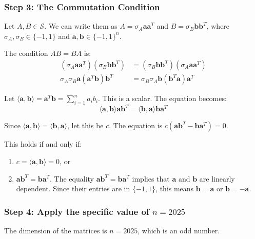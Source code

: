 \documentclass[12pt,a4paper]{article}
\theoremstyle{definition}
\begin{document}
        \subsubsection*{Step 3: The Commutation Condition}

        Let $A, B \in \mathcal{S}$. We can write them as $A = \sigma_A \mathbf{a}\mathbf{a}^T$ and $B = \sigma_B \mathbf{b}\mathbf{b}^T$, where $\sigma_A, \sigma_B \in \{-1, 1\}$ and $\mathbf{a}, \mathbf{b} \in \{-1, 1\}^n$.

        The condition $AB=BA$ is:
        \begin{align}
        (\sigma_A \mathbf{a}\mathbf{a}^T)(\sigma_B \mathbf{b}\mathbf{b}^T) &= (\sigma_B \mathbf{b}\mathbf{b}^T)(\sigma_A \mathbf{a}\mathbf{a}^T)\\
        \sigma_A\sigma_B \mathbf{a}(\mathbf{a}^T\mathbf{b})\mathbf{b}^T &= \sigma_B\sigma_A \mathbf{b}(\mathbf{b}^T\mathbf{a})\mathbf{a}^T
        \end{align}

        Let $\langle \mathbf{a}, \mathbf{b} \rangle = \mathbf{a}^T\mathbf{b} = \sum_{i=1}^n a_i b_i$. This is a scalar. The equation becomes:
        $$\langle \mathbf{a}, \mathbf{b} \rangle \mathbf{a}\mathbf{b}^T = \langle \mathbf{b}, \mathbf{a} \rangle \mathbf{b}\mathbf{a}^T$$

        Since $\langle \mathbf{a}, \mathbf{b} \rangle = \langle \mathbf{b}, \mathbf{a} \rangle$, let this be $c$. The equation is $c(\mathbf{a}\mathbf{b}^T - \mathbf{b}\mathbf{a}^T) = 0$.

        This holds if and only if:
        \begin{enumerate}
            \item $c = \langle \mathbf{a}, \mathbf{b} \rangle = 0$, or
            \item $\mathbf{a}\mathbf{b}^T = \mathbf{b}\mathbf{a}^T$. The equality $\mathbf{a}\mathbf{b}^T = \mathbf{b}\mathbf{a}^T$ implies that $\mathbf{a}$ and $\mathbf{b}$ are linearly dependent. Since their entries are in $\{-1, 1\}$, this means $\mathbf{b} = \mathbf{a}$ or $\mathbf{b} = -\mathbf{a}$.
        \end{enumerate}

        \subsubsection*{Step 4: Apply the specific value of $n=2025$}

        The dimension of the matrices is $n=2025$, which is an odd number.
\end{document}
